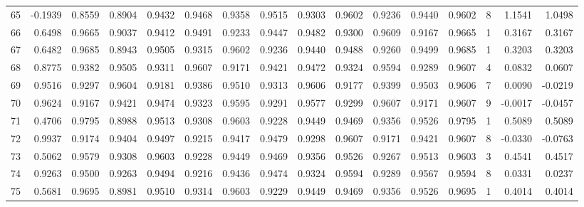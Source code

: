 \begin{tabular}{lrrrrrrrrrrrrrrr}
65  &     -0.1939 &  0.8559 &  0.8904 &  0.9432 &  0.9468 &  0.9358 &  0.9515 &  0.9303 &  0.9602 &  0.9236 &   0.9440 &     0.9602 &      8 &                    1.1541 &                     1.0498 \\
66  &      0.6498 &  0.9665 &  0.9037 &  0.9412 &  0.9491 &  0.9233 &  0.9447 &  0.9482 &  0.9300 &  0.9609 &   0.9167 &     0.9665 &      1 &                    0.3167 &                     0.3167 \\
67  &      0.6482 &  0.9685 &  0.8943 &  0.9505 &  0.9315 &  0.9602 &  0.9236 &  0.9440 &  0.9488 &  0.9260 &   0.9499 &     0.9685 &      1 &                    0.3203 &                     0.3203 \\
68  &      0.8775 &  0.9382 &  0.9505 &  0.9311 &  0.9607 &  0.9171 &  0.9421 &  0.9472 &  0.9324 &  0.9594 &   0.9289 &     0.9607 &      4 &                    0.0832 &                     0.0607 \\
69  &      0.9516 &  0.9297 &  0.9604 &  0.9181 &  0.9386 &  0.9510 &  0.9313 &  0.9606 &  0.9177 &  0.9399 &   0.9503 &     0.9606 &      7 &                    0.0090 &                    -0.0219 \\
70  &      0.9624 &  0.9167 &  0.9421 &  0.9474 &  0.9323 &  0.9595 &  0.9291 &  0.9577 &  0.9299 &  0.9607 &   0.9171 &     0.9607 &      9 &                   -0.0017 &                    -0.0457 \\
71  &      0.4706 &  0.9795 &  0.8988 &  0.9513 &  0.9308 &  0.9603 &  0.9228 &  0.9449 &  0.9469 &  0.9356 &   0.9526 &     0.9795 &      1 &                    0.5089 &                     0.5089 \\
72  &      0.9937 &  0.9174 &  0.9404 &  0.9497 &  0.9215 &  0.9417 &  0.9479 &  0.9298 &  0.9607 &  0.9171 &   0.9421 &     0.9607 &      8 &                   -0.0330 &                    -0.0763 \\
73  &      0.5062 &  0.9579 &  0.9308 &  0.9603 &  0.9228 &  0.9449 &  0.9469 &  0.9356 &  0.9526 &  0.9267 &   0.9513 &     0.9603 &      3 &                    0.4541 &                     0.4517 \\
74  &      0.9263 &  0.9500 &  0.9263 &  0.9494 &  0.9216 &  0.9436 &  0.9474 &  0.9324 &  0.9594 &  0.9289 &   0.9567 &     0.9594 &      8 &                    0.0331 &                     0.0237 \\
75  &      0.5681 &  0.9695 &  0.8981 &  0.9510 &  0.9314 &  0.9603 &  0.9229 &  0.9449 &  0.9469 &  0.9356 &   0.9526 &     0.9695 &      1 &                    0.4014 &                     0.4014 \\

\end{tabular}
